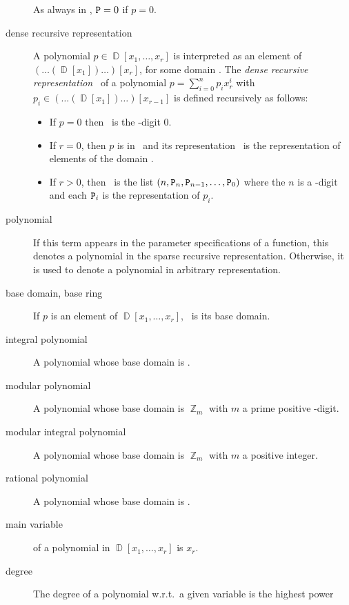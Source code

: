 \begin{description}
  As always in \saclib, ${\tt P} = 0$ if $p = 0$.
\item[dense recursive representation]
  A polynomial $p \in \BbbD[x_1,\ldots,x_r]$ is interpreted as an element
  of $(\ldots(\BbbD[x_1])\ldots)[x_r]$, for some domain \BbbD. The {\em
  dense recursive representation} \ttP\ of a polynomial $p = \sum_{i=0}^n
  p_i x_r^i$ with $p_i \in (\ldots(\BbbD[x_1])\ldots)[x_{r-1}]$ is defined
  recursively as follows:
  \begin{itemize}
  \item
    If $p = 0$ then \ttP\ is the \BETA-digit 0.
  \item
    If $r = 0$, then $p$ is in \BbbD\ and its representation \ttP\ is the
    representation of elements of the domain \BbbD.
  \item
    If $r > 0$, then \ttP\ is the list $(n, {\tt P}_n, {\tt P}_{n-1},\ldots,
    {\tt P}_0)$ where the $n$ is a \BETA-digit and each ${\tt P}_i$ is the
    representation of $p_i$.
  \end{itemize}
\item[polynomial]
  If this term appears in the parameter specifications of a function, this
  denotes a polynomial in the sparse recursive representation. Otherwise,
  it is used to denote a polynomial in arbitrary representation.
\item[base domain, base ring]
  If $p$ is an element of $\BbbD[x_1,\ldots,x_r]$, \BbbD\ is its base
  domain.
\item[integral polynomial]
  A polynomial whose base domain is \BbbZ.
\item[modular polynomial]
  A polynomial whose base domain is $\BbbZ_m$ with $m$ a prime positive
  \BETA-digit.
\item[modular integral polynomial]
  A polynomial whose base domain is $\BbbZ_m$ with $m$ a positive integer.
\item[rational polynomial]
  A polynomial whose base domain is \BbbQ.
\item[main variable]
  of a polynomial in $\BbbD[x_1,\ldots,x_r]$ is $x_r$.
\item[degree]
  The degree of a polynomial w.r.t.\ a given variable is the highest power

\end{description}
